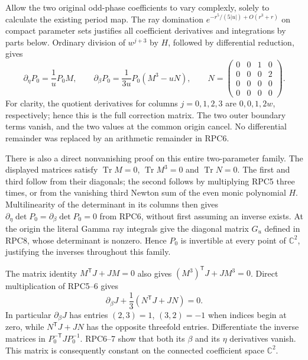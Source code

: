 Allow the two original odd-phase coefficients to vary complexly,
solely to calculate the existing period map. The ray domination
$e^{-r^5/(5|u|)+O(r^3+r)}$ on compact parameter sets justifies all
coefficient derivatives and integrations by parts below. Ordinary
division of $w^{j+3}$ by $H$, followed by differential reduction,
gives
\[
 \partial_\eta P_0=\frac1uP_0M,\qquad
 \partial_\beta P_0=\frac1{3u}P_0(M^3-uN),\qquad
 N=\begin{pmatrix}0&0&1&0\\0&0&0&2\\0&0&0&0\\0&0&0&0\end{pmatrix}.
 \tag{RPC6}
\]
For clarity, the quotient derivatives for columns $j=0,1,2,3$ are
$0,0,1,2w$, respectively; hence this is the full correction matrix.
The two outer boundary terms vanish, and the two values at the common
origin cancel. No differential remainder was replaced by an arithmetic
remainder in RPC6.

There is also a direct nonvanishing proof on this entire two-parameter
family. The displayed matrices satisfy $\operatorname{Tr}M=0$,
$\operatorname{Tr}M^3=0$ and $\operatorname{Tr}N=0$. The first and
third follow from their diagonals; the second follows by multiplying
RPC5 three times, or from the vanishing third Newton sum of the even
monic polynomial $H$. Multilinearity of the determinant in its columns
then gives $\partial_\eta\det P_0=\partial_\beta\det P_0=0$ from
RPC6, without first assuming an inverse exists. At the origin the
literal Gamma ray integrals give the diagonal matrix $G_u$ defined in
RPC8, whose determinant is nonzero. Hence $P_0$ is invertible at every
point of $\mathbb C^2$, justifying the inverses throughout this family.

The matrix identity $M^{\mathsf T}J+JM=0$ also gives
$(M^3)^{\mathsf T}J+JM^3=0$. Direct multiplication of RPC5--6 gives
\[
 \partial_\beta J+\frac13(N^{\mathsf T}J+JN)=0.
 \tag{RPC7}
\]
In particular $\partial_\beta J$ has entries $(2,3)=1$, $(3,2)=-1$
when indices begin at zero, while $N^{\mathsf T}J+JN$ has the
opposite threefold entries. Differentiate the inverse matrices in
$P_0^{-\mathsf T}JP_0^{-1}$. RPC6--7 show that both its $\beta$ and
its $\eta$ derivatives vanish. This matrix is consequently constant
on the connected coefficient space $\mathbb C^2$.

